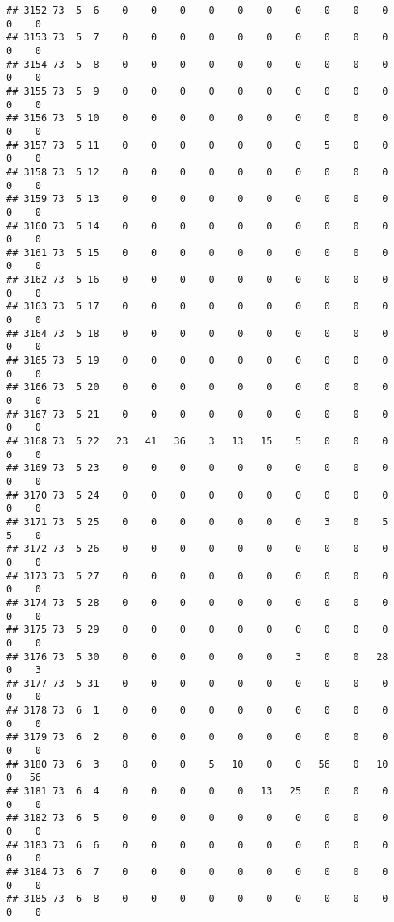 \documentclass[]{article}
\begin{document}
\begin{verbatim}
## 3152 73  5  6    0    0    0    0    0    0    0    0    0    0    0    0
## 3153 73  5  7    0    0    0    0    0    0    0    0    0    0    0    0
## 3154 73  5  8    0    0    0    0    0    0    0    0    0    0    0    0
## 3155 73  5  9    0    0    0    0    0    0    0    0    0    0    0    0
## 3156 73  5 10    0    0    0    0    0    0    0    0    0    0    0    0
## 3157 73  5 11    0    0    0    0    0    0    0    5    0    0    0    0
## 3158 73  5 12    0    0    0    0    0    0    0    0    0    0    0    0
## 3159 73  5 13    0    0    0    0    0    0    0    0    0    0    0    0
## 3160 73  5 14    0    0    0    0    0    0    0    0    0    0    0    0
## 3161 73  5 15    0    0    0    0    0    0    0    0    0    0    0    0
## 3162 73  5 16    0    0    0    0    0    0    0    0    0    0    0    0
## 3163 73  5 17    0    0    0    0    0    0    0    0    0    0    0    0
## 3164 73  5 18    0    0    0    0    0    0    0    0    0    0    0    0
## 3165 73  5 19    0    0    0    0    0    0    0    0    0    0    0    0
## 3166 73  5 20    0    0    0    0    0    0    0    0    0    0    0    0
## 3167 73  5 21    0    0    0    0    0    0    0    0    0    0    0    0
## 3168 73  5 22   23   41   36    3   13   15    5    0    0    0    0    0
## 3169 73  5 23    0    0    0    0    0    0    0    0    0    0    0    0
## 3170 73  5 24    0    0    0    0    0    0    0    0    0    0    0    0
## 3171 73  5 25    0    0    0    0    0    0    0    3    0    5    5    0
## 3172 73  5 26    0    0    0    0    0    0    0    0    0    0    0    0
## 3173 73  5 27    0    0    0    0    0    0    0    0    0    0    0    0
## 3174 73  5 28    0    0    0    0    0    0    0    0    0    0    0    0
## 3175 73  5 29    0    0    0    0    0    0    0    0    0    0    0    0
## 3176 73  5 30    0    0    0    0    0    0    3    0    0   28    0    3
## 3177 73  5 31    0    0    0    0    0    0    0    0    0    0    0    0
## 3178 73  6  1    0    0    0    0    0    0    0    0    0    0    0    0
## 3179 73  6  2    0    0    0    0    0    0    0    0    0    0    0    0
## 3180 73  6  3    8    0    0    5   10    0    0   56    0   10    0   56
## 3181 73  6  4    0    0    0    0    0   13   25    0    0    0    0    0
## 3182 73  6  5    0    0    0    0    0    0    0    0    0    0    0    0
## 3183 73  6  6    0    0    0    0    0    0    0    0    0    0    0    0
## 3184 73  6  7    0    0    0    0    0    0    0    0    0    0    0    0
## 3185 73  6  8    0    0    0    0    0    0    0    0    0    0    0    0

\end{verbatim}
\end{document}
